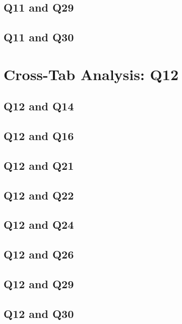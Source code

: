\documentclass{report}
\begin{document}
\clearpage
\section{Q11 and Q29}


\clearpage
\section{Q11 and Q30}


\chapter{Cross-Tab Analysis: Q12}
\section{Q12 and Q14}


\clearpage
\section{Q12 and Q16}


\clearpage
\section{Q12 and Q21}


\clearpage
\section{Q12 and Q22}


\clearpage
\section{Q12 and Q24}


\clearpage
\section{Q12 and Q26}


\clearpage
\section{Q12 and Q29}


\clearpage
\section{Q12 and Q30}

\end{document}
